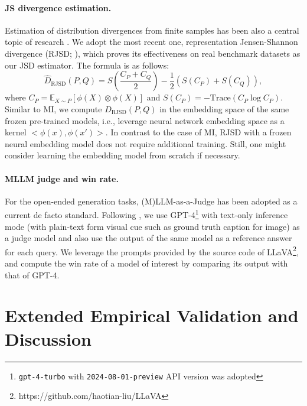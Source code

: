 \paragraph{JS divergence estimation.} Estimation of distribution divergences from finite samples has been also a central topic of research \cite{yang1999information, sriperumbudur2012empirical, li2016renyi, bu2018estimation, sinn2018non, sreekumar2022neural, hoyos2023representation}. We adopt the most recent one, representation Jensen-Shannon divergence (RJSD; \citet{hoyos2023representation, hoyos2024a}), which proves its effectiveness on real benchmark datasets as our JSD estimator. The formula is as follows:
\begin{equation}
    \hat{D}_{\text{RJSD}}(P,Q)=S(\frac{C_{P}+C_{Q}}{2}) - \frac{1}{2}(S(C_{P})+S(C_{Q})),
\end{equation}
where $C_{P}=\mathbb{E}_{X\sim P}[\phi(X) \otimes \phi(X)]$ and $S(C_{P})= -\text{Trace}(C_{P}\log C_{P})$. Similar to MI, we compute $\hat{D}_{\text{RJSD}}(P,Q)$ in the embedding space of the same frozen pre-trained models, i.e., leverage neural network embedding space as a kernel $<\phi(x),\phi(x')>$. In contrast to the case of MI, RJSD with a frozen neural embedding model does not require additional training. Still, one might consider learning the embedding model from scratch if necessary.



\paragraph{MLLM judge and win rate.} For the open-ended generation tasks, (M)LLM-as-a-Judge has been adopted as a current de facto standard. Following \cite{liu2023visual,liu2024improved}, we use GPT-4\footnote{\texttt{gpt-4-turbo} with \texttt{2024-08-01-preview} API version was adopted} with text-only inference mode (with plain-text form visual cue such as ground truth caption for image) as a judge model and also use the output of the same model as a reference answer for each query. We leverage the prompts provided by the source code of LLaVA\footnote{https://github.com/haotian-liu/LLaVA}, and compute the win rate of a model of interest by comparing its output with that of GPT-4.

\section{Extended Empirical Validation and Discussion}\label{appendix:experiment}
